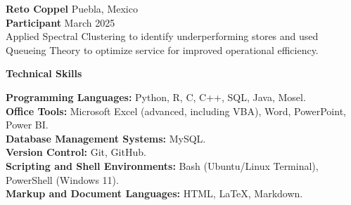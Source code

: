 \documentclass[9pt]{extarticle} %
\begin{document}
\textbf{Reto Coppel} \hfill Puebla, Mexico\\
\textbf{Participant} \hfill March 2025\\
Applied Spectral Clustering to identify underperforming stores and used Queueing Theory to optimize service for improved operational efficiency.














\begin{center}
    \vspace{1ex}
    \textbf{Technical Skills}
    \vspace{-1ex}
\end{center}

\textbf{Programming Languages:} Python, R, C, C++, SQL, Java, Mosel.\\
\textbf{Office Tools:} Microsoft Excel (advanced, including VBA), Word, PowerPoint, Power BI.\\
\textbf{Database Management Systems:} MySQL.\\
\textbf{Version Control:} Git, GitHub.\\
\textbf{Scripting and Shell Environments:} Bash (Ubuntu/Linux Terminal), PowerShell (Windows 11).\\
\textbf{Markup and Document Languages:} HTML, LaTeX, Markdown.\\
\end{document}
